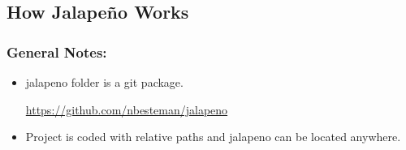 \documentclass[class=book , crop=false]{standalone}
\title{}  %
\begin{document}

\ifstandalone
\frontmatter %
\maketitle %
\tableofcontents %
\clearpage
\mainmatter %
\fi

\subsection{\large How \LARGE Jalape\~no \large Works}
\subsubsection{General Notes:}
\begin{itemize}
\item jalapeno folder is a git package.

\href{https://github.com/nbesteman/jalapeno}{https://github.com/nbesteman/jalapeno}

\item Project is coded with relative paths and jalapeno can be located anywhere.

\end{itemize}
\end{document}
